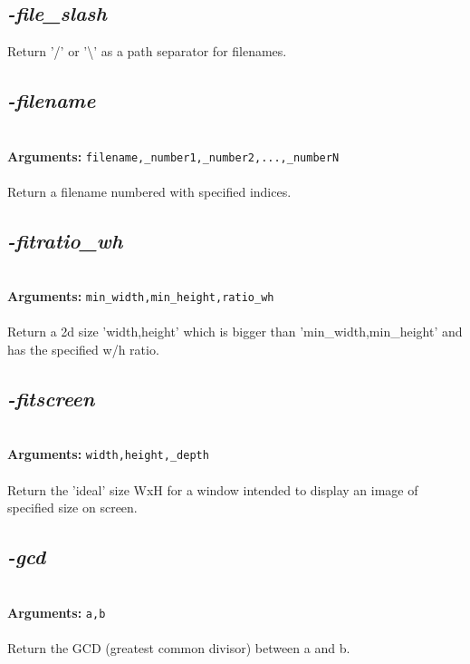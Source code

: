 \documentclass[a4paper,11pt,twoside]{book}
\begin{document}
\subsection{\emph{-file\_slash} }\vspace*{-0.5em}
Return '/' or '\textbackslash ' as a path separator for filenames.


\subsection{\emph{-filename} }\vspace*{-0.5em}
~\\\textbf{Arguments: } 
{\small \texttt{filename,\_number1,\_number2,...,\_numberN}}\\~\\
Return a filename numbered with specified indices.


\subsection{\emph{-fitratio\_wh} }\vspace*{-0.5em}
~\\\textbf{Arguments: } 
{\small \texttt{min\_width,min\_height,ratio\_wh}}\\~\\
Return a 2d size 'width,height' which is bigger than 'min\_width,min\_height' and has the specified w/h ratio.


\subsection{\emph{-fitscreen} }\vspace*{-0.5em}
~\\\textbf{Arguments: } 
{\small \texttt{width,height,\_depth}}\\~\\
Return the 'ideal' size WxH for a window intended to display an image of specified size on screen.


\subsection{\emph{-gcd} }\vspace*{-0.5em}
~\\\textbf{Arguments: } 
{\small \texttt{a,b}}\\~\\
Return the GCD (greatest common divisor) between a and b.
\end{document}
